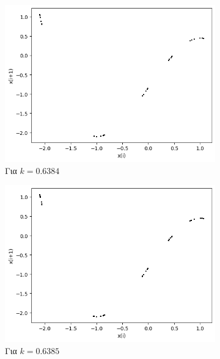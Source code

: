 \begin{figure}[ht]
\begin{subfigure}[b]{0.4\textwidth}
		\includegraphics[width=\textwidth]{LateX images/graphs q21/g11}
		\caption{Για $k=0.6384$}
		\label{f:k111}
	\end{subfigure}
	\hfill
	\begin{subfigure}[b]{0.4\textwidth}
		\centering
		\includegraphics[width=\textwidth]{LateX images/graphs q21/g12}
		\caption{Για $k=0.6385$}
		\label{f:k112}
	\end{subfigure}
	\hfill
	\begin{subfigure}[b]{0.4\textwidth}
		\centering

\end{subfigure}
\end{figure}
